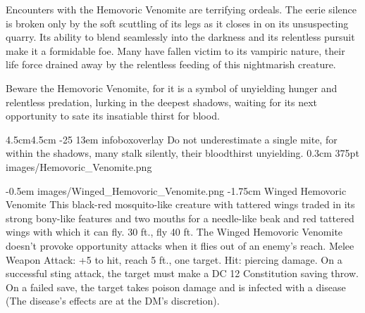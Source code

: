 \documentclass[letterpaper,openany,twoside,twocolumn]{book}
\begin{document}
Encounters with the Hemovoric Venomite are terrifying ordeals. The eerie silence is broken only by the soft scuttling of its legs as it closes in on its unsuspecting quarry. Its ability to blend seamlessly into the darkness and its relentless pursuit make it a formidable foe. Many have fallen victim to its vampiric nature, their life force drained away by the relentless feeding of this nightmarish creature.

Beware the Hemovoric Venomite, for it is a symbol of unyielding hunger and relentless predation, lurking in the deepest shadows, waiting for its next opportunity to sate its insatiable thirst for blood.

\MonsterGraphicAndShortInfo%
	{4.5cm}{4.5cm}%
	{-25}%
	{13em}%
	{infoboxoverlay} %
	{Do not underestimate a single mite, for within the shadows, many stalk silently, their bloodthirst unyielding.}%
	{0.3cm}%
	{375pt}%
	{images/Hemovoric_Venomite.png}%

\vfill\eject %

\MonsterVariant%
	{-0.5em}%
	{images/Winged_Hemovoric_Venomite.png}%
	{-1.75cm} %
	{Winged Hemovoric Venomite}%
	{%
		This black-red mosquito-like creature with tattered wings traded in its strong bony-like features and two mouths for a needle-like beak and red tattered wings with which it can fly.
		30 ft., fly 40 ft.
		The Winged Hemovoric Venomite doesn't provoke opportunity attacks when it flies out of an enemy's reach.
		Melee Weapon Attack: +5 to hit, reach 5 ft., one target. Hit:  piercing damage. On a successful sting attack, the target must make a DC 12 Constitution saving throw. On a failed save, the target takes  poison damage and is infected with a disease (The disease's effects are at the DM's discretion).
	}%
\end{document}
